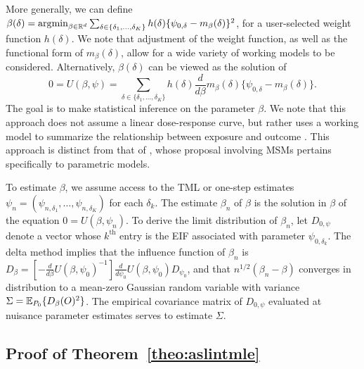 More generally, we can define $\beta(\delta)=\operatorname*{\arg\!\min}_{\beta \in \mathbb{R}^d}
\sum_{\delta \in \{\delta_1, \ldots, \delta_K\}} h(\delta)\{\psi_{0,\delta}
- m_{\beta}(\delta)\}^2$, for a user-selected weight function $h(\delta)$. We
note that adjustment of the weight function, as well as the functional form of
$m_{\beta}(\delta)$, allow for a wide variety of working models to be
considered. Alternatively, $\beta(\delta)$ can be viewed as the solution of
\begin{equation*}
  0 = U(\beta,\psi) = \sum_{\delta \in \{\delta_1, \ldots, \delta_K\}}
  h(\delta) \frac{d}{d\beta} m_{\beta}(\delta) \{\psi_{0,\delta} -
  m_{\beta}(\delta)\}.
\end{equation*}
The goal is to make statistical inference on the parameter $\beta$. We note that
this approach does not assume a linear dose-response curve, but rather uses
a working model to summarize the relationship between exposure and outcome
\citep{neugebauer2007nonparametric}. This approach is distinct from that of
\citet{haneuse2013estimation}, whose proposal involving MSMs pertains
specifically to parametric models.

To estimate $\beta$, we assume access to the TML or one-step estimates $\psi_n
= (\psi_{n, \delta_1}, \ldots, \psi_{n,\delta_K})$ for each $\delta_k$. The
estimate $\beta_n$ of $\beta$ is the solution in $\beta$ of the equation $0
= U(\beta,\psi_n)$. To derive the limit distribution of $\beta_n$, let
$D_{0,\psi}$ denote a vector whose $k^{\text{th}}$ entry is the EIF associated
with parameter $\psi_{0,\delta_k}$. The delta method implies that the influence
function of $\beta_n$ is $D_{\beta} = [-\frac{d}{d \beta} U(\beta,\psi_0)^{-1}]
\frac{d}{d\psi_0} U(\beta, \psi_0) D_{\psi_0}$, and that $n^{1/2} (\beta_n
- \beta)$ converges in distribution to a mean-zero Gaussian random variable with
variance $\Sigma = \mathbb{E}_{P_0}\{D_{\beta}(O)^2\}$. The empirical covariance matrix
of $D_{0,\psi}$ evaluated at nuisance parameter estimates serves to estimate
$\Sigma$.

\subsection{Proof of Theorem~\ref{theo:aslintmle}}

